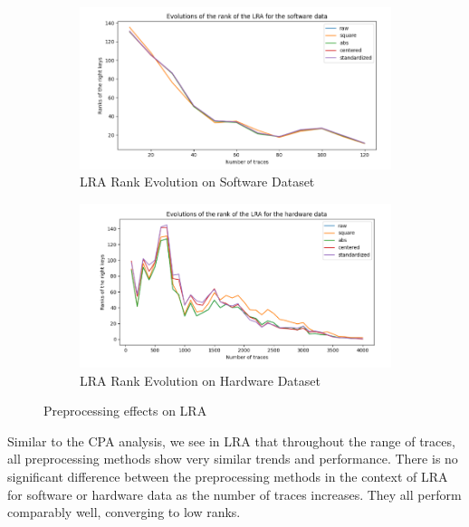 \documentclass[a4paper,10pt]{article}
\begin{document}
\begin{figure}[h]
    \begin{subfigure}{.5\textwidth}
    \centering
      \includegraphics[width=1\linewidth]{LRA_software.png}
      \caption{LRA Rank Evolution on Software Dataset}
      \label{LRAsoftware}
    \end{subfigure}%
    \begin{subfigure}{.5\textwidth}
    \centering
      \includegraphics[width=1\linewidth]{LRA_hardware.png}
      \caption{LRA Rank Evolution on Hardware Dataset}
      \label{LRAhardware}
    \end{subfigure}
    \caption{Preprocessing effects on LRA}
\end{figure}

Similar to the CPA analysis, we see in LRA that throughout the range of traces, all preprocessing methods show very similar trends and performance.
There is no significant difference between the preprocessing methods in the context of LRA for software or hardware data as the number of traces increases. They all perform comparably well, converging to low ranks.
\newpage
\end{document}
